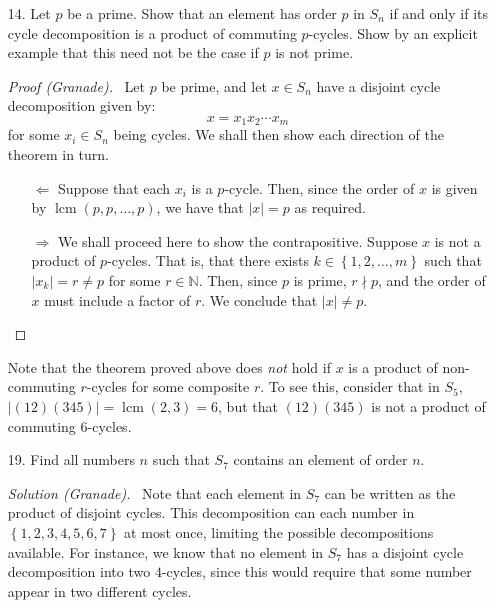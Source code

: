 \documentclass[10pt]{article}
\newcommand{\N}{\mathbb{N}}
\newcommand{\lcm}{\operatorname{lcm}}
\begin{document}
\begin{itemize}

\item[14.] Let $p$ be a prime. Show that an element has order $p$ in
$S_n$ if and only if its cycle decomposition is a product of commuting
$p$-cycles. Show by an explicit example that this need not be the case
if $p$ is not prime.

\begin{proof}[Proof (Granade)] \ Let $p$ be prime, and let $x\in S_n$
have a disjoint cycle decomposition given by:
$$
    x = x_1 x_2 \cdots x_m
$$
for some $x_i \in S_n$ being cycles. We shall then show each direction
of the theorem in turn.

\begin{itemize}

\item[$\Leftarrow$] Suppose that each $x_i$ is a $p$-cycle. Then, since
the order of $x$ is given by
$\lcm \left(p, p, \dots, p\right)$, we have that
$\left\vert x \right\vert = p$ as required.

\item[$\Rightarrow$] We shall proceed here to show the contrapositive.
Suppose $x$ is not a product of $p$-cycles. That is, that there exists
$k \in \left\{1,2,\dots,m\right\}$ such that $\vert x_k  \vert = r \ne p$ for some
$r\in\N$. Then, since $p$ is prime, $r\nmid p$, and the order of
$x$ must include a factor of $r$. We conclude that
$\left\vert x \right\vert \ne p$.
\end{itemize}
\end{proof}

Note that the theorem proved above does \emph{not} hold if $x$ is a
product of non-commuting $r$-cycles for some composite $r$. To see this,
consider that in $S_5$,
$\left\vert \left(12\right) \left(345\right)\right\vert =
\lcm\left(2,3\right) = 6$, but that
$\left(12\right)\left(345\right)$ is not a product of commuting
$6$-cycles.


\item[19.] Find all numbers $n$ such that $S_7$ contains an element of
order $n$.

\emph{Solution (Granade).} \ Note that each element in $S_7$ can be
written as the product of disjoint cycles. This decomposition can each
number in $\left\{1,2,3,4,5,6,7\right\}$ at most once, limiting the
possible decompositions available. For instance, we know that no element
in $S_7$ has a disjoint cycle decomposition into two $4$-cycles, since
this would require that some number appear in two different cycles.


\end{itemize}
\end{document}
